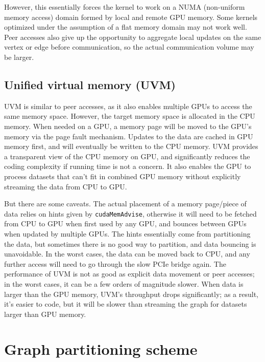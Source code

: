 \documentclass[10pt,oneside]{memoir}
\begin{document}
However, this essentially forces the kernel to work on a NUMA
(non-uniform memory access) domain formed by local and remote GPU
memory. Some kernels optimized under the assumption of a flat memory
domain may not work well. Peer accesses also give up the opportunity to
aggregate local updates on the same vertex or edge before communication,
so the actual communication volume may be larger.

\hypertarget{unified-virtual-memory-uvm}{%
\subsection{Unified virtual memory
(UVM)}\label{unified-virtual-memory-uvm}}

UVM is similar to peer accesses, as it also enables multiple GPUs to
access the same memory space. However, the target memory space is
allocated in the CPU memory. When needed on a GPU, a memory page will be
moved to the GPU's memory via the page fault mechanism. Updates to the
data are cached in GPU memory first, and will eventually be written to
the CPU memory. UVM provides a transparent view of the CPU memory on
GPU, and significantly reduces the coding complexity if running time is
not a concern. It also enables the GPU to process datasets that can't
fit in combined GPU memory without explicitly streaming the data from
CPU to GPU.

But there are some caveats. The actual placement of a memory page/piece
of data relies on hints given by \texttt{cudaMemAdvise}, otherwise it
will need to be fetched from CPU to GPU when first used by any GPU, and
bounces between GPUs when updated by multiple GPUs. The hints
essentially come from partitioning the data, but sometimes there is no
good way to partition, and data bouncing is unavoidable. In the worst
cases, the data can be moved back to CPU, and any further access will
need to go through the slow PCIe bridge again. The performance of UVM is
not as good as explicit data movement or peer accesses; in the worst
cases, it can be a few orders of magnitude slower. When data is larger
than the GPU memory, UVM's throughput drops significantly; as a result,
it's easier to code, but it will be slower than streaming the graph for
datasets larger than GPU memory.

\hypertarget{graph-partitioning-scheme}{%
\section{Graph partitioning scheme}\label{graph-partitioning-scheme}}
\end{document}

